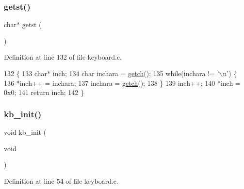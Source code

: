 \subsubsection{\texorpdfstring{getst()}{getst()}}
{\footnotesize\ttfamily char$\ast$ getst (\begin{DoxyParamCaption}{ }\end{DoxyParamCaption})}



Definition at line 132 of file keyboard.\+c.


\begin{DoxyCode}
132               \{
133     \textcolor{keywordtype}{char}* inch;
134     \textcolor{keywordtype}{char} inchara = \hyperlink{a00038_af3facad10e05defa48d45b46eb9ebe7e_af3facad10e05defa48d45b46eb9ebe7e}{getch}();
135     \textcolor{keywordflow}{while}(inchara != \textcolor{charliteral}{'\(\backslash\)n'}) \{
136         *inch++ = inchara;
137         inchara = \hyperlink{a00038_af3facad10e05defa48d45b46eb9ebe7e_af3facad10e05defa48d45b46eb9ebe7e}{getch}();
138     \}
139     inch++;
140     *inch = 0x0;
141     \textcolor{keywordflow}{return} inch;
142 \}
\end{DoxyCode}
\mbox{\label{a00038_aabdb223e5290f3b3c07bc82d075b87d7_aabdb223e5290f3b3c07bc82d075b87d7}} 
\subsubsection{\texorpdfstring{kb\+\_\+init()}{kb\_init()}}
{\footnotesize\ttfamily void kb\+\_\+init (\begin{DoxyParamCaption}\item[{void}]{ }\end{DoxyParamCaption})}



Definition at line 54 of file keyboard.\+c.


